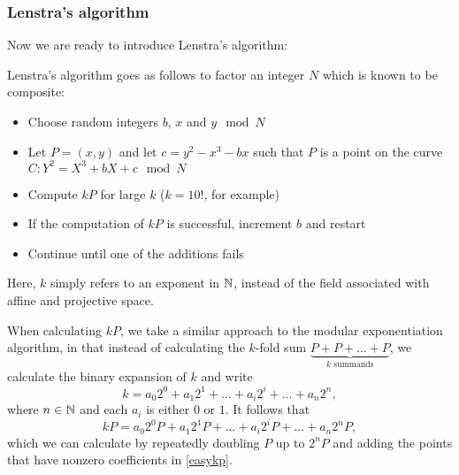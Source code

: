 \subsubsection{Lenstra's algorithm}
Now we are ready to introduce Lenstra's algorithm:
\begin{definition}
	Lenstra's algorithm goes as follows to factor an integer $N$ which is known to be composite:
	\begin{itemize}
		\item Choose random integers $b$, $x$ and $y \mod N$
		\item Let $P = (x,y)$ and let $c = y^2 - x^3 - bx$ such that $P$ is a point on the curve $C: Y^2 = X^3 +bX + c \mod N$
		\item Compute $kP$ for large $k$ ($k=10!$, for example)
		\item If the computation of $kP$ is successful, increment $b$ and restart
		\item Continue until one of the additions fails
	\end{itemize}
\end{definition}
Here, $k$ simply refers to an exponent in $\mathbb{N}$, instead of the field associated with affine and projective space.

When calculating $kP$, we take a similar approach to the modular exponentiation algorithm, in that instead of calculating the $k$-fold sum $\underbrace{P+P+\ldots+P}_{k\text{ summands}}$, we calculate the binary expansion of $k$ and write
$$k = a_0 2^0 + a_1 2^1 + \ldots + a_i 2^i + \ldots + a_n 2^n,$$
where $n\in\mathbb{N}$ and each $a_i$ is either $0$ or $1$. It follows that
\begin{equation}
kP = a_0 2^0 P + a_1 2^1 P + \ldots + a_i 2^i P + \ldots + a_n 2^n P,
\label{easykp}
\end{equation}
which we can calculate by repeatedly doubling $P$ up to $2^n P$ and adding the points that have nonzero coefficients in \cref{easykp}.

